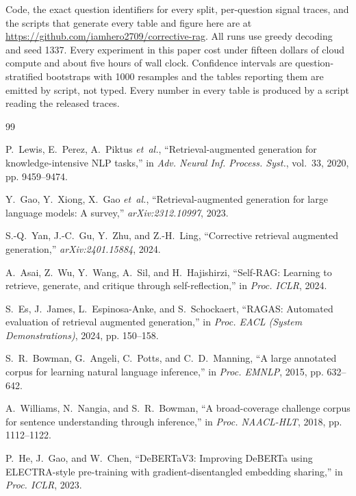 \documentclass[conference]{IEEEtran}
\begin{document}
Code, the exact question identifiers for every split, per-question signal
traces, and the scripts that generate every table and figure here are at
\url{https://github.com/iamhero2709/corrective-rag}. All runs use greedy
decoding and seed 1337. Every experiment in this paper cost under fifteen
dollars of cloud compute and about five hours of wall clock.
Confidence intervals are question-stratified bootstraps with 1000 resamples and
the tables reporting them are emitted by script, not typed. Every number in
every table is produced by a script reading the released traces.

\balance

\begin{thebibliography}{99}

P.~Lewis, E.~Perez, A.~Piktus \emph{et~al.},
``Retrieval-augmented generation for knowledge-intensive {NLP} tasks,''
in \emph{Adv. Neural Inf. Process. Syst.}, vol.~33, 2020, pp. 9459--9474.

Y.~Gao, Y.~Xiong, X.~Gao \emph{et~al.},
``Retrieval-augmented generation for large language models: A survey,''
\emph{arXiv:2312.10997}, 2023.

S.-Q.~Yan, J.-C.~Gu, Y.~Zhu, and Z.-H.~Ling,
``Corrective retrieval augmented generation,''
\emph{arXiv:2401.15884}, 2024.

A.~Asai, Z.~Wu, Y.~Wang, A.~Sil, and H.~Hajishirzi,
``Self-{RAG}: Learning to retrieve, generate, and critique through
self-reflection,'' in \emph{Proc. ICLR}, 2024.

S.~Es, J.~James, L.~Espinosa-Anke, and S.~Schockaert,
``{RAGAS}: Automated evaluation of retrieval augmented generation,''
in \emph{Proc. EACL (System Demonstrations)}, 2024, pp. 150--158.

S.~R.~Bowman, G.~Angeli, C.~Potts, and C.~D.~Manning,
``A large annotated corpus for learning natural language inference,''
in \emph{Proc. EMNLP}, 2015, pp. 632--642.

A.~Williams, N.~Nangia, and S.~R.~Bowman,
``A broad-coverage challenge corpus for sentence understanding through
inference,'' in \emph{Proc. NAACL-HLT}, 2018, pp. 1112--1122.

P.~He, J.~Gao, and W.~Chen,
``{DeBERTaV3}: Improving {DeBERTa} using {ELECTRA}-style pre-training with
gradient-disentangled embedding sharing,'' in \emph{Proc. ICLR}, 2023.


\end{thebibliography}
\end{document}
